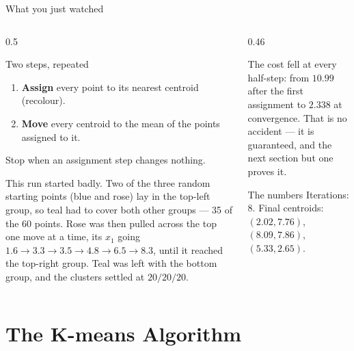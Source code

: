\documentclass[aspectratio=169,10pt]{beamer}
\begin{document}
\begin{frame}{What you just watched}
  \begin{columns}[T,onlytextwidth]
    \begin{column}{0.5\textwidth}
      \begin{block}{Two steps, repeated}
        \footnotesize
        \begin{enumerate}
          \item \textbf{Assign} every point to its nearest centroid (recolour).
          \item \textbf{Move} every centroid to the mean of the points assigned to it.
        \end{enumerate}
        Stop when an assignment step changes nothing.
      \end{block}
      \footnotesize
      This run started badly. Two of the three random starting points (blue and rose) lay
      in the top-left group, so teal had to cover both other groups --- 35 of the 60 points.
      Rose was then pulled across the top one move at a time, its $x_1$ going
      $1.6\to3.3\to3.5\to4.8\to6.5\to8.3$, until it reached the top-right group. Teal was
      left with the bottom group, and the clusters settled at $20/20/20$.
    \end{column}
    \begin{column}{0.46\textwidth}
      \footnotesize
      \begin{keyidea}
        The cost fell at every half-step: from $10.99$ after the first assignment to
        $2.338$ at convergence. That is no accident --- it is guaranteed, and the next
        section but one proves it.
      \end{keyidea}
      \begin{block}{The numbers}
        Iterations: $8$. Final centroids:
        $(2.02,7.76)$, $(8.09,7.86)$, $(5.33,2.65)$.
      \end{block}
    \end{column}
  \end{columns}
\end{frame}

\section{The K-means Algorithm}
\end{document}
